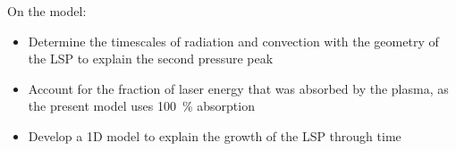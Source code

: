         On the model:
        \begin{itemize}
            \item Determine the timescales of radiation and convection with the geometry of the LSP to explain the second pressure peak
            \item Account for the fraction of laser energy that was absorbed by the plasma, as the present model uses \qty{100}{\%} absorption
            \item Develop a 1D model to explain the growth of the LSP through time
        \end{itemize}
        